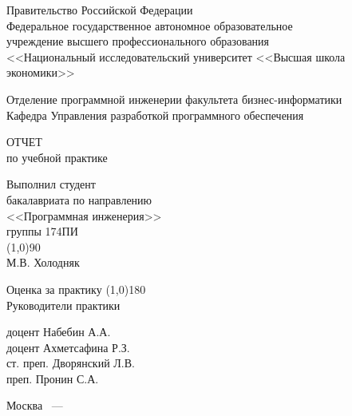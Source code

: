 

\begin{titlepage}
	\newpage
	
	\begin{center}
		{\large Правительство Российской Федерации \\
			Федеральное государственное автономное образовательное \\
			учреждение высшего профессионального образования \\
		<<Национальный исследовательский университет <<Высшая школа экономики>>}
		
		\bigskip
				
		{\large Отделение программной инженерии факультета бизнес-информатики  \\
		Кафедра Управления разработкой программного обеспечения }
				
		\vspace{3cm}
				
		{\large \MakeTextUppercase{Отчет}\\
		по учебной практике}
		
		\bigskip
		
		\begin{flushright}
			Выполнил студент\\
			бакалавриата по направлению\\
			<<Программная инженерия>>\\
			группы 174ПИ \bigskip \\
			\line(1,0){90} \medskip \\
			М.В. Холодняк\\
		\end{flushright}
		\bigskip
			
		\begin{flushleft}
			Оценка за практику \; \line(1,0){180} \medskip \\
			Руководители практики 
		\end{flushleft}
		\bigskip
			
		\begin{flushright}
			доцент Набебин А.А.\\
			доцент Ахметсафина Р.З.\\
			ст. преп. Дворянский Л.В.\\
			преп. Пронин С.А.
		\end{flushright}
		\vfill
		
		Москва ~--- \number\year
		
	\end{center}
\end{titlepage}

